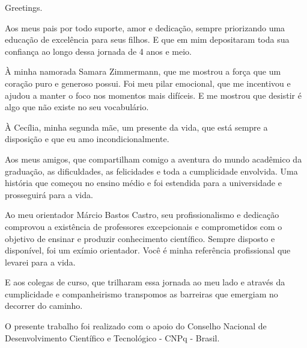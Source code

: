 
\begin{agradecimentos}

\lang
{
    Greetings.
}
{
    Aos meus pais por todo suporte,
    amor e dedicação, sempre priorizando uma educação de
    excelência para seus filhos. E que em mim depositaram
    toda sua confiança ao longo dessa jornada de 4 anos e meio.

    À minha namorada Samara Zimmermann, que me mostrou
    a força que um coração puro e generoso possui. Foi meu pilar
    emocional, que me incentivou e ajudou a manter o foco nos
    momentos mais difíceis. E me mostrou que desistir
    é algo que não existe no seu vocabulário.

    À Cecília, minha segunda mãe, um presente da vida,
    que está sempre a disposição e que eu amo incondicionalmente.

    Aos meus amigos, que compartilham comigo a aventura do mundo
    acadêmico da graduação, as dificuldades, as felicidades e toda
    a cumplicidade envolvida. Uma história que começou no ensino
    médio e foi estendida para a universidade e prosseguirá para a vida.
    
    Ao meu orientador Márcio Bastos Castro, seu profissionalismo
    e dedicação comprovou a existência de professores excepcionais
    e comprometidos com o objetivo de ensinar e produzir conhecimento
    científico. Sempre disposto e disponível, foi um exímio orientador.
    Você é minha referência profissional que levarei para a vida.
    
    E aos colegas de curso, que trilharam essa jornada ao
    meu lado e através da cumplicidade e companheirismo transpomos
    as barreiras que emergiam no decorrer do caminho.

    O presente trabalho foi realizado com o apoio do Conselho Nacional 
    de Desenvolvimento Científico e Tecnológico - CNPq - Brasil.
}

\end{agradecimentos}


%
%
%
